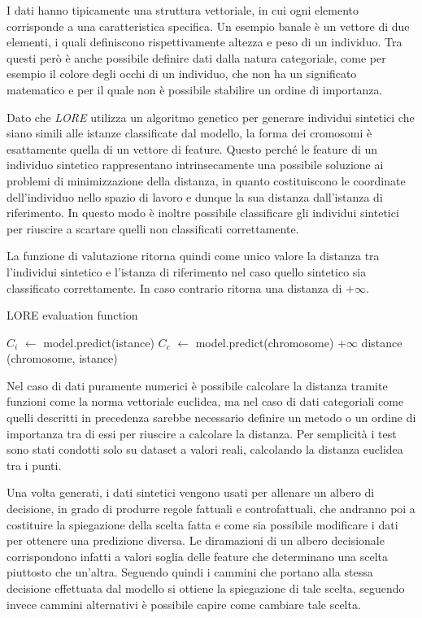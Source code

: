 I dati hanno tipicamente una struttura vettoriale, in cui ogni elemento
corrisponde a una caratteristica specifica. Un esempio banale è un vettore di
due elementi, i quali definiscono rispettivamente altezza e peso di un
individuo. Tra questi però è anche possibile definire dati dalla natura
categoriale, come per esempio il colore degli occhi di un individuo, che non ha
un significato matematico e per il quale non è possibile stabilire un ordine di
importanza.

Dato che \textit{LORE} utilizza un algoritmo genetico per generare individui
sintetici che siano simili alle istanze classificate dal modello, la forma dei
cromosomi è esattamente quella di un vettore di feature. Questo perché le
feature di un individuo sintetico rappresentano intrinsecamente una possibile
soluzione ai problemi di minimizzazione della distanza, in quanto costituiscono
le coordinate dell'individuo nello spazio di lavoro e dunque la sua distanza
dall'istanza di riferimento. In questo modo è inoltre possibile classificare
gli individui sintetici per riuscire a scartare quelli non classificati
correttamente.

La funzione di valutazione ritorna quindi come unico valore la distanza tra
l'individui sintetico e l'istanza di riferimento nel caso quello sintetico sia
classificato correttamente. In caso contrario ritorna una distanza di $+\infty$.

\begin{algorithm}[H]
	\caption{LORE evaluation function}
	\begin{algorithmic}
		\State $C_i$ $\gets$ model.predict(istance)
		\State $C_c$ $\gets$ model.predict(chromosome)
		\State \Return $+\infty$
		\Else
		\State \Return distance (chromosome, istance)
		\EndIf
		\EndFunction
	\end{algorithmic}
	\label{alg: lore_eval}
\end{algorithm}

Nel caso di dati puramente numerici è possibile calcolare la distanza tramite
funzioni come la norma vettoriale euclidea, ma nel caso di dati categoriali
come quelli descritti in precedenza sarebbe necessario definire un metodo o un
ordine di importanza tra di essi per riuscire a calcolare la distanza. Per
semplicità i test sono stati condotti solo su dataset a valori reali, calcolando
la distanza euclidea tra i punti.

Una volta generati, i dati sintetici vengono usati per allenare un albero di
decisione, in grado di produrre regole fattuali e controfattuali, che andranno
poi a costituire la spiegazione della scelta fatta e come sia possibile
modificare i dati per ottenere una predizione diversa. Le diramazioni di un
albero decisionale corrispondono infatti a valori soglia delle feature che
determinano una scelta piuttosto che un'altra. Seguendo quindi i cammini che
portano alla stessa decisione effettuata dal modello si ottiene la spiegazione
di tale scelta, seguendo invece cammini alternativi è possibile capire come
cambiare tale scelta.
